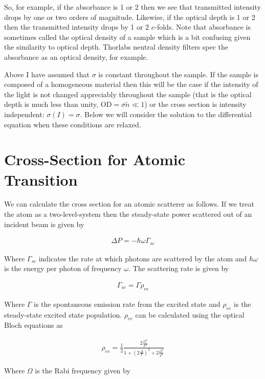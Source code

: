 \documentclass[12pt]{article}
\begin{document}
So, for example, if the absorbance is 1 or 2 then we see that transmitted intensity drops by one or two orders of magnitude.
Likewise, if the optical depth is 1 or 2 then the transmitted intensity drops by 1 or 2 $e$-folds.
Note that absorbance is sometimes called the optical density of a sample which is a bit confusing given the similarity to optical depth.
Thorlabs neutral density filters spec the absorbance as an optical density, for example.

Above I have assumed that $\sigma$ is constant throughout the sample.
If the sample is composed of a homogeneous material then this will be the case if the intensity of the light is not changed appreciably throughout the sample (that is the optical depth is much less than unity, $\text{OD} = \sigma \tilde{n} \ll 1$) or the cross section is intensity independent: $\sigma(I) = \sigma$.
Below we will consider the solution to the differential equation when these conditions are relaxed.

\section{Cross-Section for Atomic Transition}

We can calculate the cross section for an atomic scatterer as follows.
If we treat the atom as a two-level-system then the steady-state power scattered out of an incident beam is given by

\begin{align}
\Delta P = -\hbar \omega \Gamma_{sc}
\end{align}

Where $\Gamma_{sc}$ indicates the rate at which photons are scattered by the atom and $\hbar \omega$ is the energy per photon of frequency $\omega$.
The scattering rate is given by

\begin{align}
\Gamma_{sc} = \Gamma \rho_{ee}
\end{align}

Where $\Gamma$ is the spontaneous emission rate from the excited state and $\rho_{ee}$ is the steady-state excited state population.
$\rho_{ee}$ can be calculated using the optical Bloch equations as

\begin{align}
\rho_{ee} = \frac{1}{2}\frac{2 \frac{\Omega^2}{\Gamma^2}}{1 + \left(2\frac{\Delta}{\Gamma}\right)^2 + 2 \frac{\Omega^2}{\Gamma^2}}
\end{align}

Where $\Omega$ is the Rabi frequency given by
\end{document}
